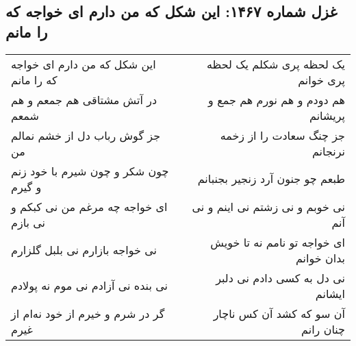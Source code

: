 \begin{center}
\section*{غزل شماره ۱۴۶۷: این شکل که من دارم ای خواجه که را مانم}
\label{sec:1467}
\begin{longtable}{l p{0.5cm} r}
این شکل که من دارم ای خواجه که را مانم
&&
یک لحظه پری شکلم یک لحظه پری خوانم
\\
در آتش مشتاقی هم جمعم و هم شمعم
&&
هم دودم و هم نورم هم جمع و پریشانم
\\
جز گوش رباب دل از خشم نمالم من
&&
جز چنگ سعادت را از زخمه نرنجانم
\\
چون شکر و چون شیرم با خود زنم و گیرم
&&
طبعم چو جنون آرد زنجیر بجنبانم
\\
ای خواجه چه مرغم من نی کبکم و نی بازم
&&
نی خوبم و نی زشتم نی اینم و نی آنم
\\
نی خواجه بازارم نی بلبل گلزارم
&&
ای خواجه تو نامم نه تا خویش بدان خوانم
\\
نی بنده نی آزادم نی موم نه پولادم
&&
نی دل به کسی دادم نی دلبر ایشانم
\\
گر در شرم و خیرم از خود نه‌ام از غیرم
&&
آن سو که کشد آن کس ناچار چنان رانم
\\
\end{longtable}
\end{center}

